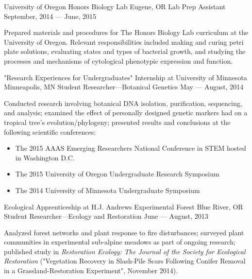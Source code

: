 
\showoff
{University of Oregon Honors Biology Lab}
{Eugene, OR}
{Lab Prep Assistant}
{September, 2014 --- June, 2015}

Prepared materials and procedures for The Honors Biology Lab curriculum at the University of Oregon. Relevant responsibilities included making and curing petri plate solutions, evaluating states and types of bacterial growth, and studying the processes and mechanisms of cytological phenotypic expression and function.

\myBreak

\showoff
{"Research Experiences for Undergraduates" Internship at University of Minnesota}
{Minneapolis, MN}
{Student Researcher---Botanical Genetics}
{May --- August, 2014}

Conducted research involving botanical DNA isolation, purification, sequencing, and analysis; examined the effect of personally designed genetic markers had on a tropical tree’s evolution/phylogeny; presented results and conclusions at the following scientific conferences:
\begin{itemize}[label=$\triangleright$]
\item{The 2015 AAAS Emerging Researchers National Conference in STEM hosted in Washington D.C.}
\item{The 2015 University of Oregon Undergraduate Research Symposium}
\item{The 2014 University of Minnesota Undergraduate Symposium}
\end{itemize}

\myBreak

\showoff
{Ecological Apprenticeship at H.J. Andrews Experimental Forest}
{Blue River, OR}
{Student Researcher---Ecology and Restoration}
{June --- August, 2013}

Analyzed forest networks and plant response to fire disturbances; surveyed plant communities in experimental sub-alpine meadows as part of ongoing research; published study in \textit{Restoration Ecology: The Journal of the Society for Ecological Restoration} ("Vegetation Recovery in Slash-Pile Scars Following Conifer Removal in a Grassland-Restoration Experiment", November 2014).
